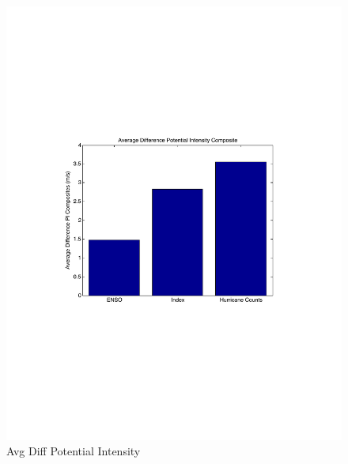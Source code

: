 \documentclass[]{article}
\begin{document}
\begin{figure}[ht]
\begin{minipage}[b]{0.6\linewidth}
\includegraphics[width=\textwidth]{figures/sensitivityResults/compositeBarGraphs/avgDiffPIAtlanticCompositesBarGraph.pdf}
\caption{Avg Diff Potential Intensity}
\label{fig:figure31}
\end{minipage}
\hspace{0cm}
\begin{minipage}[b]{0.6\linewidth}

\end{minipage}
\end{figure}
\end{document}
